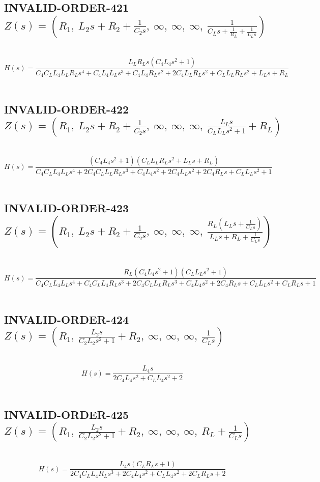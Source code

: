 \documentclass{article}
\begin{document}
\subsection{INVALID-ORDER-421 $Z(s) = \left( R_{1}, \  L_{2} s + R_{2} + \frac{1}{C_{2} s}, \  \infty, \  \infty, \  \infty, \  \frac{1}{C_{L} s + \frac{1}{R_{L}} + \frac{1}{L_{L} s}}\right)$ } \ 
\textbf{\[H(s) = \frac{L_{L} R_{L} s \left(C_{4} L_{4} s^{2} + 1\right)}{C_{4} C_{L} L_{4} L_{L} R_{L} s^{4} + C_{4} L_{4} L_{L} s^{3} + C_{4} L_{4} R_{L} s^{2} + 2 C_{4} L_{L} R_{L} s^{2} + C_{L} L_{L} R_{L} s^{2} + L_{L} s + R_{L}}\] } \ 
\subsection{INVALID-ORDER-422 $Z(s) = \left( R_{1}, \  L_{2} s + R_{2} + \frac{1}{C_{2} s}, \  \infty, \  \infty, \  \infty, \  \frac{L_{L} s}{C_{L} L_{L} s^{2} + 1} + R_{L}\right)$ } \ 
\textbf{\[H(s) = \frac{\left(C_{4} L_{4} s^{2} + 1\right) \left(C_{L} L_{L} R_{L} s^{2} + L_{L} s + R_{L}\right)}{C_{4} C_{L} L_{4} L_{L} s^{4} + 2 C_{4} C_{L} L_{L} R_{L} s^{3} + C_{4} L_{4} s^{2} + 2 C_{4} L_{L} s^{2} + 2 C_{4} R_{L} s + C_{L} L_{L} s^{2} + 1}\] } \ 
\subsection{INVALID-ORDER-423 $Z(s) = \left( R_{1}, \  L_{2} s + R_{2} + \frac{1}{C_{2} s}, \  \infty, \  \infty, \  \infty, \  \frac{R_{L} \left(L_{L} s + \frac{1}{C_{L} s}\right)}{L_{L} s + R_{L} + \frac{1}{C_{L} s}}\right)$ } \ 
\textbf{\[H(s) = \frac{R_{L} \left(C_{4} L_{4} s^{2} + 1\right) \left(C_{L} L_{L} s^{2} + 1\right)}{C_{4} C_{L} L_{4} L_{L} s^{4} + C_{4} C_{L} L_{4} R_{L} s^{3} + 2 C_{4} C_{L} L_{L} R_{L} s^{3} + C_{4} L_{4} s^{2} + 2 C_{4} R_{L} s + C_{L} L_{L} s^{2} + C_{L} R_{L} s + 1}\] } \ 
\subsection{INVALID-ORDER-424 $Z(s) = \left( R_{1}, \  \frac{L_{2} s}{C_{2} L_{2} s^{2} + 1} + R_{2}, \  \infty, \  \infty, \  \infty, \  \frac{1}{C_{L} s}\right)$ } \ 
\textbf{\[H(s) = \frac{L_{4} s}{2 C_{4} L_{4} s^{2} + C_{L} L_{4} s^{2} + 2}\] } \ 
\subsection{INVALID-ORDER-425 $Z(s) = \left( R_{1}, \  \frac{L_{2} s}{C_{2} L_{2} s^{2} + 1} + R_{2}, \  \infty, \  \infty, \  \infty, \  R_{L} + \frac{1}{C_{L} s}\right)$ } \ 
\textbf{\[H(s) = \frac{L_{4} s \left(C_{L} R_{L} s + 1\right)}{2 C_{4} C_{L} L_{4} R_{L} s^{3} + 2 C_{4} L_{4} s^{2} + C_{L} L_{4} s^{2} + 2 C_{L} R_{L} s + 2}\] } \ 
\end{document}
